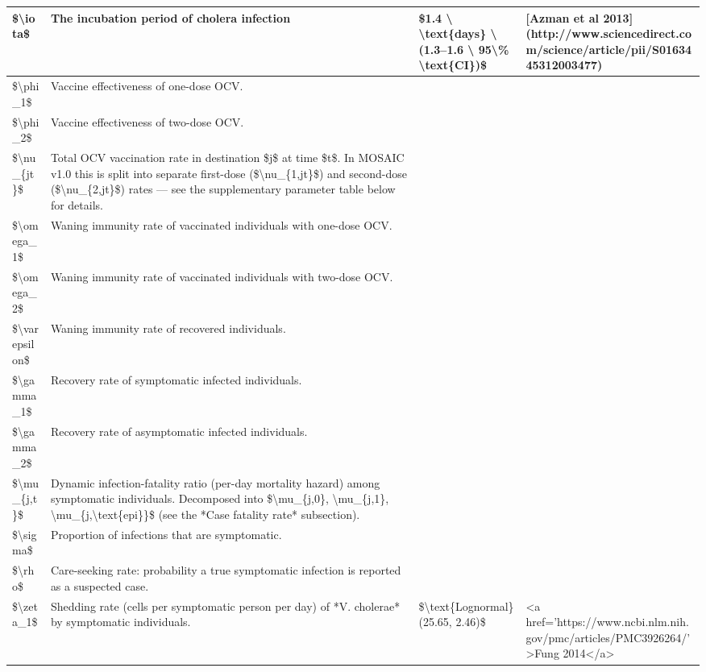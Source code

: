 \documentclass[
]{book}
\begin{document}
\begin{tabular}{l|l|l|l}
\hline
\$\textbackslash{}iota\$ & The incubation period of cholera infection & \$1.4 \textbackslash{} \textbackslash{}text\{days\} \textbackslash{} (1.3–1.6 \textbackslash{} 95\textbackslash{}\% \textbackslash{}text\{CI\})\$ & [Azman et al 2013](http://www.sciencedirect.com/science/article/pii/S0163445312003477)\\
\hline
\$\textbackslash{}phi\_1\$ & Vaccine effectiveness of one-dose OCV. &  & \\
\hline
\$\textbackslash{}phi\_2\$ & Vaccine effectiveness of two-dose OCV. &  & \\
\hline
\$\textbackslash{}nu\_\{jt\}\$ & Total OCV vaccination rate in destination \$j\$ at time \$t\$. In MOSAIC v1.0 this is split into separate first-dose (\$\textbackslash{}nu\_\{1,jt\}\$) and second-dose (\$\textbackslash{}nu\_\{2,jt\}\$) rates --- see the supplementary parameter table below for details. &  & \\
\hline
\$\textbackslash{}omega\_1\$ & Waning immunity rate of vaccinated individuals with one-dose OCV. &  & \\
\hline
\$\textbackslash{}omega\_2\$ & Waning immunity rate of vaccinated individuals with two-dose OCV. &  & \\
\hline
\$\textbackslash{}varepsilon\$ & Waning immunity rate of recovered individuals. &  & \\
\hline
\$\textbackslash{}gamma\_1\$ & Recovery rate of symptomatic infected individuals. &  & \\
\hline
\$\textbackslash{}gamma\_2\$ & Recovery rate of asymptomatic infected individuals. &  & \\
\hline
\$\textbackslash{}mu\_\{j,t\}\$ & Dynamic infection-fatality ratio (per-day mortality hazard) among symptomatic individuals. Decomposed into \$\textbackslash{}mu\_\{j,0\}, \textbackslash{}mu\_\{j,1\}, \textbackslash{}mu\_\{j,\textbackslash{}text\{epi\}\}\$ (see the *Case fatality rate* subsection). &  & \\
\hline
\$\textbackslash{}sigma\$ & Proportion of infections that are symptomatic. &  & \\
\hline
\$\textbackslash{}rho\$ & Care-seeking rate: probability a true symptomatic infection is reported as a suspected case. &  & \\
\hline
\$\textbackslash{}zeta\_1\$ & Shedding rate (cells per symptomatic person per day) of *V. cholerae* by symptomatic individuals. & \$\textbackslash{}text\{Lognormal\}(25.65, 2.46)\$ & <a href='https://www.ncbi.nlm.nih.gov/pmc/articles/PMC3926264/'>Fung 2014</a>\\

\end{tabular}
\end{document}
